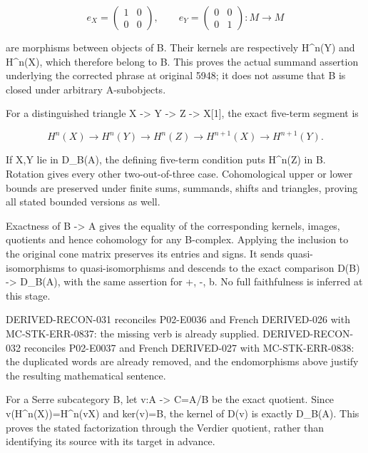 \documentclass[11pt]{article}
\begin{document}
\[
 e_X=\begin{pmatrix}1&0\\0&0\end{pmatrix},\qquad
 e_Y=\begin{pmatrix}0&0\\0&1\end{pmatrix}:M\longrightarrow M
\]

are morphisms between objects of B. Their kernels are respectively H\textasciicircum{}n(Y)\allowbreak{} and H\textasciicircum{}n(X)\allowbreak{},\allowbreak{} which therefore belong to B. This proves the actual summand assertion underlying the corrected phrase at original 5948; it does not assume that B is closed under arbitrary A-subobjects.

For a distinguished triangle X \allowbreak{}-> Y \allowbreak{}-> Z \allowbreak{}-> X[1]\allowbreak{},\allowbreak{} the exact five-term segment is

\[
 H^n(X)\longrightarrow H^n(Y)\longrightarrow H^n(Z)
       \longrightarrow H^{n+1}(X)\longrightarrow H^{n+1}(Y).
\]

If X,\allowbreak{}Y lie in D\_\allowbreak{}B(A)\allowbreak{},\allowbreak{} the defining five-term condition puts H\textasciicircum{}n(Z)\allowbreak{} in B. Rotation gives every other two-out-of-three case. Cohomological upper or lower bounds are preserved under finite sums,\allowbreak{} summands,\allowbreak{} shifts and triangles,\allowbreak{} proving all stated bounded versions as well.

Exactness of B \allowbreak{}-> A gives the equality of the corresponding kernels,\allowbreak{} images,\allowbreak{} quotients and hence cohomology for any B-complex. Applying the inclusion to the original cone matrix preserves its entries and signs. It sends quasi-isomorphisms to quasi-isomorphisms and descends to the exact comparison D(B)\allowbreak{} \allowbreak{}-> D\_\allowbreak{}B(A)\allowbreak{},\allowbreak{} with the same assertion for \allowbreak{}+,\allowbreak{} -,\allowbreak{} b. No full faithfulness is inferred at this stage.

DERIVED-RECON-031 reconciles P02-E0036 and French DERIVED-026 with MC-STK-ERR-0837:\allowbreak{} the missing verb is already supplied. DERIVED-RECON-032 reconciles P02-E0037 and French DERIVED-027 with MC-STK-ERR-0838:\allowbreak{} the duplicated words are already removed,\allowbreak{} and the endomorphisms above justify the resulting mathematical sentence.

For a Serre subcategory B,\allowbreak{} let v:\allowbreak{}A \allowbreak{}-> C\allowbreak{}=A/\allowbreak{}B be the exact quotient. Since v(H\textasciicircum{}n(X)\allowbreak{})\allowbreak{}\allowbreak{}=H\textasciicircum{}n(vX)\allowbreak{} and ker(v)\allowbreak{}\allowbreak{}=B,\allowbreak{} the kernel of D(v)\allowbreak{} is exactly D\_\allowbreak{}B(A)\allowbreak{}. This proves the stated factorization through the Verdier quotient,\allowbreak{} rather than identifying its source with its target in advance.
\end{document}
